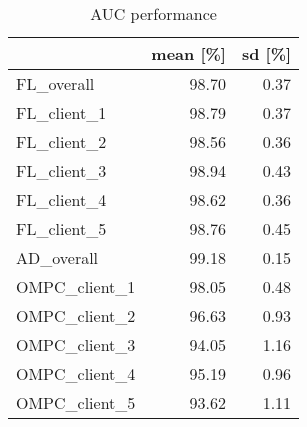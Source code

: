 \begin{table}[h]
\centering
\caption{AUC performance}
\label{tab:auc_performance}
\begin{tabular}{lrr}
\toprule
{} &  mean [\%] &  sd [\%] \\
\midrule
FL\_overall    &     98.70 &    0.37 \\
FL\_client\_1   &     98.79 &    0.37 \\
FL\_client\_2   &     98.56 &    0.36 \\
FL\_client\_3   &     98.94 &    0.43 \\
FL\_client\_4   &     98.62 &    0.36 \\
FL\_client\_5   &     98.76 &    0.45 \\
AD\_overall    &     99.18 &    0.15 \\
OMPC\_client\_1 &     98.05 &    0.48 \\
OMPC\_client\_2 &     96.63 &    0.93 \\
OMPC\_client\_3 &     94.05 &    1.16 \\
OMPC\_client\_4 &     95.19 &    0.96 \\
OMPC\_client\_5 &     93.62 &    1.11 \\
\bottomrule
\end{tabular}
\end{table}

